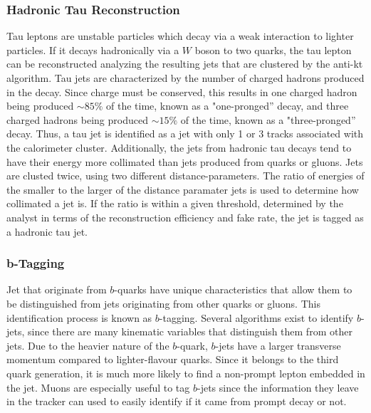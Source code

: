 \subsubsection{Hadronic Tau Reconstruction}
\label{tau_reco_overview}

\par Tau leptons are unstable particles which decay via a weak
interaction to lighter particles.  If it decays hadronically via a $W$
boson to two quarks, the tau lepton can be reconstructed analyzing the
resulting jets that are clustered by the anti-kt algorithm.  Tau jets
are characterized by the number of charged hadrons produced in the
decay.  Since charge must be conserved, this results in one charged
hadron being produced $\sim85\%$ of the time, known as a
"one-pronged'' decay, and three charged hadrons being produced
$\sim15\%$ of the time, known as a "three-pronged'' decay.  Thus, a
tau jet is identified as a jet with only 1 or 3 tracks associated with
the calorimeter cluster.  Additionally, the jets from hadronic tau
decays tend to have their energy more collimated than jets produced
from quarks or gluons.  Jets are clusted twice, using two different
distance-parameters.  The ratio of energies of the smaller to the larger of the
distance paramater jets is used to determine how collimated a jet is.
If the ratio is within a given threshold, determined by the analyst in
terms of the reconstruction efficiency and fake rate, the jet is
tagged as a hadronic tau jet. 

\subsubsection{b-Tagging}
\label{b_tagging_overview}

\par Jet that originate from $b$-quarks have unique characteristics
that allow them to be distinguished from jets originating from other
quarks or gluons. This identification process is known as
$b$-tagging.  Several algorithms exist to identify $b$-jets, since
there are many kinematic variables that distinguish them from other
jets.  Due to the heavier nature of the $b$-quark, $b$-jets have
a larger transverse momentum compared to lighter-flavour quarks.
Since it belongs to the third quark generation, it is much more likely
to find a non-prompt lepton embedded in the jet.  Muons are especially
useful to tag $b$-jets since the information they leave in the tracker
can used to easily identify if it came from prompt decay or not.  

